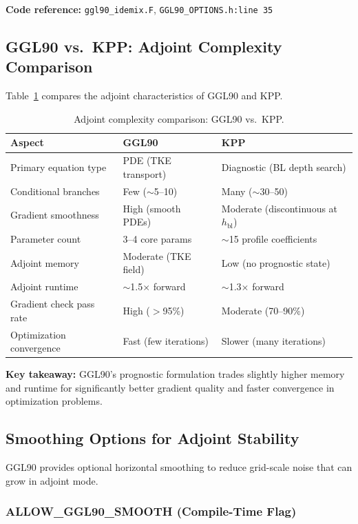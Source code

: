 \documentclass[12pt,letterpaper]{article}
\begin{document}
\textbf{Code reference:} \texttt{ggl90\_idemix.F}, \texttt{GGL90\_OPTIONS.h:line~35}

\subsection{GGL90 vs.\ KPP: Adjoint Complexity Comparison}

Table~\ref{tab:ggl90_kpp_adjoint} compares the adjoint characteristics of GGL90 and KPP.

\begin{table}[h!]
\centering
\caption{Adjoint complexity comparison: GGL90 vs.\ KPP.}
\label{tab:ggl90_kpp_adjoint}
\begin{tabular}{@{}lll@{}}
\toprule
\textbf{Aspect} & \textbf{GGL90} & \textbf{KPP} \\
\midrule
Primary equation type & PDE (TKE transport) & Diagnostic (BL depth search) \\
Conditional branches & Few ($\sim$5--10) & Many ($\sim$30--50) \\
Gradient smoothness & High (smooth PDEs) & Moderate (discontinuous at $h_{\mathrm{bl}}$) \\
Parameter count & 3--4 core params & $\sim$15 profile coefficients \\
Adjoint memory & Moderate (TKE field) & Low (no prognostic state) \\
Adjoint runtime & $\sim$1.5$\times$ forward & $\sim$1.3$\times$ forward \\
Gradient check pass rate & High ($>$95\%) & Moderate (70--90\%) \\
Optimization convergence & Fast (few iterations) & Slower (many iterations) \\
\bottomrule
\end{tabular}
\end{table}

\textbf{Key takeaway:} GGL90's prognostic formulation trades slightly higher memory and runtime for significantly better gradient quality and faster convergence in optimization problems.

\subsection{Smoothing Options for Adjoint Stability}

GGL90 provides optional horizontal smoothing to reduce grid-scale noise that can grow in adjoint mode.

\subsubsection{ALLOW\_GGL90\_SMOOTH (Compile-Time Flag)}
\end{document}
